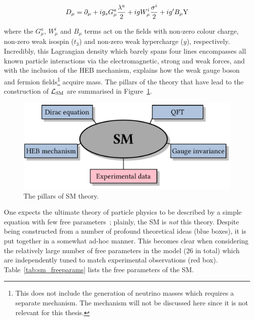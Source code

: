\begin{equation}
    D_\mu = \partial_\mu + i g_s G^a_\mu \frac{\lambda^a}{2} + i g W^i_\mu \frac{\sigma^i}{2} + i g' B_\mu {\rm{Y}}
\end{equation}

\noindent
where the $G^a_\mu$, $W^i_\mu$ and $B_\mu$ terms act on the fields with non-zero colour charge, non-zero weak isospin ($t_3$) and non-zero weak hypercharge ($y$), respectively. Incredibly, this Lagrangian density which barely spans four lines encompasses all known particle interactions via the electromagnetic, strong and weak forces, and with the inclusion of the HEB mechanism, explains how the weak gauge boson and fermion fields\footnote{This does not include the generation of neutrino masses which requires a separate mechanism. The mechanism will not be discussed here since it is not relevant for this thesis.} acquire mass. The pillars of the theory that have lead to the construction of $\mathcal{L}_{\rm{SM}}$ are summarised in Figure~\ref{fig:sm_pillars}.

\begin{figure}[htb!]
  \centering
  \includegraphics[width=.7\linewidth]{Figures/theory/pillars_of_sm.pdf}
  \caption[The pillars of SM theory]
  {
    The pillars of SM theory.
  }
  \label{fig:sm_pillars}
\end{figure}

One expects the ultimate theory of particle physics to be described by a simple equation with few free parameters~\cite{Thomson:2013zua}; plainly, the SM is \textit{not} this theory. Despite being constructed from a number of profound theoretical ideas (blue boxes), it is put together in a somewhat ad-hoc manner. This becomes clear when considering the relatively large number of free parameters in the model (26 in total) which are independently tuned to match experimental observations (red box). Table~\ref{tab:sm_freeparams} lists the free parameters of the SM.

